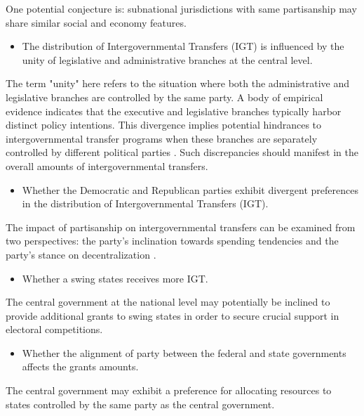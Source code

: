 One potential conjecture is: subnational jurisdictions with same partisanship may share similar social and economy features.

\begin{itemize}
    \item  The distribution of Intergovernmental Transfers (IGT) is influenced by the unity of legislative and administrative branches at the central level.
\end{itemize}


The term "unity" here refers to the situation where both the administrative and legislative branches are controlled by the same party. A body of empirical evidence indicates that the executive and legislative branches typically harbor distinct policy intentions. This divergence implies potential hindrances to intergovernmental transfer programs when these branches are separately controlled by different political parties \parencite{peterson1994executive,carreras2014outsiders, farhang2012legislative}. Such discrepancies should manifest in the overall amounts of intergovernmental transfers.

\begin{itemize}
    \item Whether the Democratic and Republican parties exhibit divergent preferences in the distribution of Intergovernmental Transfers (IGT).
\end{itemize}

The impact of partisanship on intergovernmental transfers can be examined from two perspectives: the party's inclination towards spending tendencies and the party's stance on decentralization \parencite{dinan2020stability, freeman1986political}.

\begin{itemize}
    \item Whether a swing states receives more IGT.
\end{itemize}

The central government at the national level may potentially be inclined to provide additional grants to swing states in order to secure crucial support in electoral competitions.

\begin{itemize}
    \item Whether the alignment of party between the federal and state governments affects the grants amounts.
\end{itemize}

The central government may exhibit a preference for allocating resources to states controlled by the same party as the central government.

